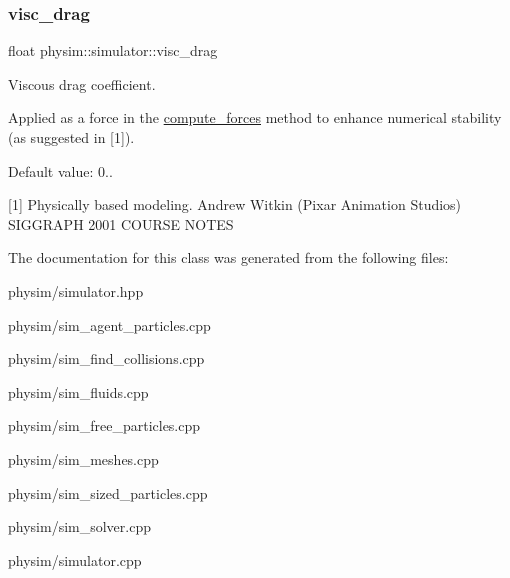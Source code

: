 \subsubsection{\texorpdfstring{visc\+\_\+drag}{visc\_drag}}
{\footnotesize\ttfamily float physim\+::simulator\+::visc\+\_\+drag\hspace{0.3cm}{\ttfamily [private]}}



Viscous drag coefficient. 

Applied as a force in the \hyperlink{classphysim_1_1simulator_a00c7815358139bf08b2e13fe1ab377bc}{compute\+\_\+forces} method to enhance numerical stability (as suggested in \mbox{[}1\mbox{]}).

Default value\+: 0..

\mbox{[}1\mbox{]} Physically based modeling. Andrew Witkin (Pixar Animation Studios) S\+I\+G\+G\+R\+A\+PH 2001 C\+O\+U\+R\+SE N\+O\+T\+ES 

The documentation for this class was generated from the following files\+:\begin{DoxyCompactItemize}
\item 
physim/simulator.\+hpp\item 
physim/sim\+\_\+agent\+\_\+particles.\+cpp\item 
physim/sim\+\_\+find\+\_\+collisions.\+cpp\item 
physim/sim\+\_\+fluids.\+cpp\item 
physim/sim\+\_\+free\+\_\+particles.\+cpp\item 
physim/sim\+\_\+meshes.\+cpp\item 
physim/sim\+\_\+sized\+\_\+particles.\+cpp\item 
physim/sim\+\_\+solver.\+cpp\item 
physim/simulator.\+cpp\end{DoxyCompactItemize}
